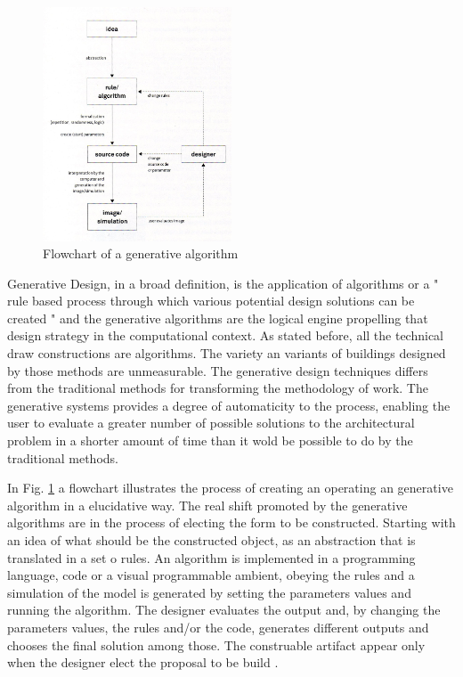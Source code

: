 \documentclass[preprint,12pt,3p]{elsarticle}
\begin{document}
\begin{figure}[!h]
\begin{center}
\includegraphics[width=0.5\textwidth]{fluxogramametodologia.jpg}
\caption{Flowchart of a generative algorithm }
\label{figura:fluxogramametodologia}
\end{center}
\end{figure}

Generative Design, in a broad definition, is the application of algorithms or a " rule based process through which various potential design solutions can be created " \cite{fasoulaki2008} and the generative algorithms are the logical engine propelling that design strategy in the computational context. As stated before, all the technical draw constructions are algorithms. The variety an variants of buildings designed by those methods are unmeasurable. The generative design techniques differs from the traditional methods for transforming the methodology of work. The generative systems provides a degree of automaticity to the process, enabling the user to evaluate a greater number of possible solutions to the architectural problem in a shorter amount of time than it wold be possible to do by the traditional methods.


In Fig. \ref{figura:fluxogramametodologia} \cite{bohnacker2012} a flowchart illustrates the process of creating an operating an generative algorithm in a elucidative way. The real shift promoted by the generative algorithms are in the process of electing the form to be constructed. Starting with an idea of what should be the constructed object, as an abstraction that is translated in a set o rules. An algorithm is implemented in a programming language, code or a visual programmable ambient, obeying the rules and a simulation of the model is generated by setting the parameters values and running the algorithm. The designer evaluates the output and, by changing the parameters values, the rules and/or the code, generates different outputs and chooses the final solution among those. The construable artifact appear only when the designer elect the proposal to be build \cite{DIno2012}.
\end{document}

